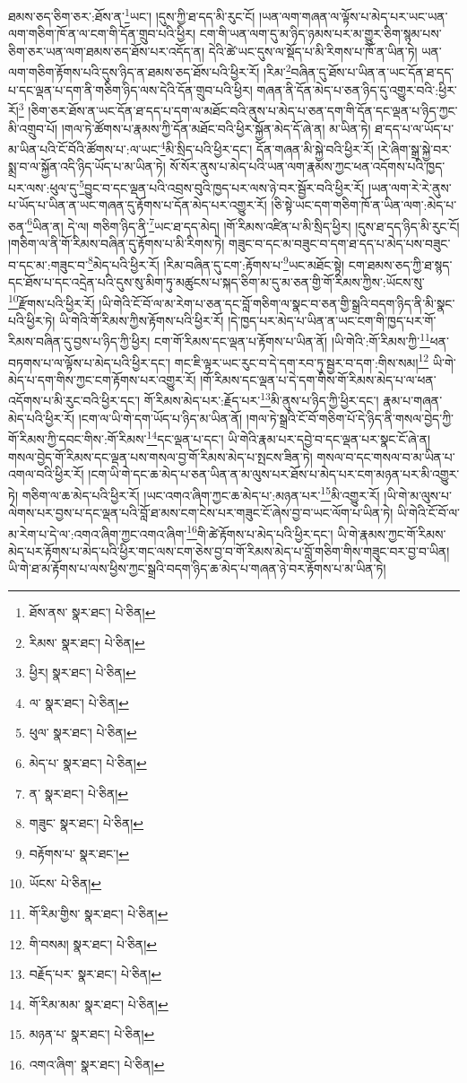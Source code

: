 ཐམས་ཅད་ཅིག་ཅར་:ཐོས་ན་\footnote{ཐོས་ནས་  སྣར་ཐང་།  པེ་ཅིན། }ཡང་། །དུས་ཀྱི་ཐ་དད་མི་རུང་ངོ། །ཡན་ལག་གཞན་ལ་ལྟོས་པ་མེད་པར་ཡང་ཡན་ལག་གཅིག་ཁོ་ན་ལ་ངག་གི་དོན་གྲུབ་པའི་ཕྱིར། ངག་གི་ཡན་ལག་དུ་མ་ཉིད་ཉམས་པར་མ་གྱུར་ཅིག་སྙམ་པས་ཅིག་ཅར་ཡན་ལག་ཐམས་ཅད་ཐོས་པར་འདོད་ན། དེའི་ཚེ་ཡང་དུས་ལ་སྡོད་པ་མི་རིགས་པ་ཁོ་ན་ཡིན་ཏེ། ཡན་ལག་གཅིག་རྟོགས་པའི་དུས་ཉིད་ན་ཐམས་ཅད་ཐོས་པའི་ཕྱིར་རོ། །རིམ་\footnote{རིམས་  སྣར་ཐང་།  པེ་ཅིན། }བཞིན་དུ་ཐོས་པ་ཡིན་ན་ཡང་དོན་ཐ་དད་པ་དང་ལྡན་པ་དག་ནི་གཅིག་ཉིད་ལས་དེའི་དོན་གྲུབ་པའི་ཕྱིར། གཞན་ནི་དོན་མེད་པ་ཅན་ཉིད་དུ་འགྱུར་བའི་:ཕྱིར་རོ།\footnote{ཕྱིར།  སྣར་ཐང་།  པེ་ཅིན། } །ཅིག་ཅར་ཐོས་ན་ཡང་དོན་ཐ་དད་པ་དག་ལ་མཐོང་བའི་ནུས་པ་མེད་པ་ཅན་དག་གི་དོན་དང་ལྡན་པ་ཉིད་ཀྱང་མི་འགྲུབ་པོ། །གལ་ཏེ་ཚོགས་པ་རྣམས་ཀྱི་དོན་མཐོང་བའི་ཕྱིར་སྐྱོན་མེད་དོ་ཞེ་ན། མ་ཡིན་ཏེ། ཐ་དད་པ་ལ་ཡོད་པ་མ་ཡིན་པའི་ངོ་བོའི་ཚོགས་པ་:ལ་ཡང་\footnote{ལ་  སྣར་ཐང་།  པེ་ཅིན། }མི་སྲིད་པའི་ཕྱིར་དང་། དོན་གཞན་མི་སྐྱེ་བའི་ཕྱིར་རོ། །རེ་ཞིག་སྒྲ་སྐྱེ་བར་སྨྲ་བ་ལ་སྐྱོན་འདི་ཉིད་ཡོད་པ་མ་ཡིན་ཏེ། སོ་སོར་ནུས་པ་མེད་པའི་ཡན་ལག་རྣམས་ཀྱང་ཕན་འདོགས་པའི་ཁྱད་པར་ལས་:ཕུལ་དུ་\footnote{ཕུལ་  སྣར་ཐང་།  པེ་ཅིན། }བྱུང་བ་དང་ལྡན་པའི་འབྲས་བུའི་ཁྱད་པར་ལས་ཉེ་བར་སྦྱོར་བའི་ཕྱིར་རོ། །ཡན་ལག་རེ་རེ་ནུས་པ་ཡོད་པ་ཡིན་ན་ཡང་གཞན་དུ་རྟོགས་པ་དོན་མེད་པར་འགྱུར་རོ། །ཅི་སྟེ་ཡང་དག་གཅིག་ཁོ་ན་ཡིན་ལག་:མེད་པ་ཅན་\footnote{མེད་པ་  སྣར་ཐང་།  པེ་ཅིན། }ཡིན་ན། དེ་ལ། གཅིག་ཉིད་ནི་\footnote{ན་  སྣར་ཐང་།  པེ་ཅིན། }ཡང་ཐ་དད་མེད། །གོ་རིམས་འཛིན་པ་མི་སྲིད་ཕྱིར། །དུས་ཐ་དད་ཉིད་མི་རུང་ངོ། །གཅིག་ལ་ནི་གོ་རིམས་བཞིན་དུ་རྟོགས་པ་མི་རིགས་ཏེ། གཟུང་བ་དང་མ་བཟུང་བ་དག་ཐ་དད་པ་མེད་པས་བཟུང་བ་དང་མ་:གཟུང་བ་\footnote{གཟུང་  སྣར་ཐང་།  པེ་ཅིན། }མེད་པའི་ཕྱིར་རོ། །རིམ་བཞིན་དུ་ངག་:རྟོགས་པ་\footnote{བརྟོགས་པ་  སྣར་ཐང་། }ཡང་མཐོང་སྟེ། ངག་ཐམས་ཅད་ཀྱི་ཐ་སྙད་དང་ཐོས་པ་དང་འདྲེན་པའི་དུས་སུ་མིག་ཏུ་མཚུངས་པ་སྐད་ཅིག་མ་དུ་མ་ཅན་གྱི་གོ་རིམས་ཀྱིས་:ཡོངས་སུ་\footnote{ཡོངས་  པེ་ཅིན། }རྫོགས་པའི་ཕྱིར་རོ། །ཡི་གེའི་ངོ་བོ་ལ་མ་རེག་པ་ཅན་དང་བློ་གཅིག་ལ་སྣང་བ་ཅན་གྱི་སྒྲའི་བདག་ཉིད་ནི་མི་སྣང་པའི་ཕྱིར་ཏེ། ཡི་གེའི་གོ་རིམས་ཀྱིས་རྟོགས་པའི་ཕྱིར་རོ། །དེ་ཁྱད་པར་མེད་པ་ཡིན་ན་ཡང་ངག་གི་ཁྱད་པར་གོ་རིམས་བཞིན་དུ་བྱས་པ་ཉིད་ཀྱི་ཕྱིར། ངག་གོ་རིམས་དང་ལྡན་པ་རྟོགས་པ་ཡིན་ནོ། །ཡི་གེའི་:གོ་རིམས་ཀྱི་\footnote{གོ་རིམ་གྱིས་  སྣར་ཐང་།  པེ་ཅིན། }ཕན་བཏགས་པ་ལ་ལྟོས་པ་མེད་པའི་ཕྱིར་དང་། གང་ཇི་ལྟར་ཡང་རུང་བ་དེ་དག་རབ་ཏུ་སྦྱར་བ་དག་:གིས་སམ།\footnote{གི་བསམ།  སྣར་ཐང་།  པེ་ཅིན། } ཡི་གེ་མེད་པ་དག་གིས་ཀྱང་ངག་རྟོགས་པར་འགྱུར་རོ། །གོ་རིམས་དང་ལྡན་པ་དེ་དག་གིས་གོ་རིམས་མེད་པ་ལ་ཕན་འདོགས་པ་མི་རུང་བའི་ཕྱིར་དང་། གོ་རིམས་མེད་པར་:རྗོད་པར་\footnote{བརྗོད་པར་  སྣར་ཐང་།  པེ་ཅིན། }མི་ནུས་པ་ཉིད་ཀྱི་ཕྱིར་དང་། རྣམ་པ་གཞན་མེད་པའི་ཕྱིར་རོ། །ངག་ལ་ཡི་གེ་དག་ཡོད་པ་ཉིད་མ་ཡིན་ནོ། །གལ་ཏེ་སྒྲའི་ངོ་བོ་གཅིག་པོ་དེ་ཉིད་ནི་གསལ་བྱེད་ཀྱི་གོ་རིམས་ཀྱི་དབང་གིས་:གོ་རིམས་\footnote{གོ་རིམ་མམ་  སྣར་ཐང་།  པེ་ཅིན། }དང་ལྡན་པ་དང་། ཡི་གེའི་རྣམ་པར་དབྱེ་བ་དང་ལྡན་པར་སྣང་ངོ་ཞེ་ན། གསལ་བྱེད་གོ་རིམས་དང་ལྡན་པས་གསལ་བྱ་གོ་རིམས་མེད་པ་སྤངས་ཟིན་ཏེ། གསལ་བ་དང་གསལ་བ་མ་ཡིན་པ་འགལ་བའི་ཕྱིར་རོ། །ངག་ཡི་གེ་དང་ཆ་མེད་པ་ཅན་ཡིན་ན་མ་ལུས་པར་ཐོས་པ་མེད་པར་ངག་མཉན་པར་མི་འགྱུར་ཏེ། གཅིག་ལ་ཆ་མེད་པའི་ཕྱིར་རོ། །ཡང་འགའ་ཞིག་ཀྱང་ཆ་མེད་པ་:མཉན་པར་\footnote{མཉན་པ་  སྣར་ཐང་།  པེ་ཅིན། }མི་འགྱུར་རོ། །ཡི་གེ་མ་ལུས་པ་ལེགས་པར་བྱས་པ་དང་ལྡན་པའི་བློ་ཐ་མས་ངག་ངེས་པར་གཟུང་ངོ་ཞེས་བྱ་བ་ཡང་ལོག་པ་ཡིན་ཏེ། ཡི་གེའི་ངོ་བོ་ལ་མ་རེག་པ་དེ་ལ་:འགའ་ཞིག་ཀྱང་འགའ་ཞིག་\footnote{འགའ་ཞིག་  སྣར་ཐང་།  པེ་ཅིན། }གི་ཚེ་རྟོགས་པ་མེད་པའི་ཕྱིར་དང་། ཡི་གེ་རྣམས་ཀྱང་གོ་རིམས་མེད་པར་རྟོགས་པ་མེད་པའི་ཕྱིར་གང་ལས་ངག་ཅེས་བྱ་བ་གོ་རིམས་མེད་པ་བློ་གཅིག་གིས་གཟུང་བར་བྱ་བ་ཡིན། ཡི་གེ་ཐ་མ་རྟོགས་པ་ལས་ཕྱིས་ཀྱང་སྒྲའི་བདག་ཉིད་ཆ་མེད་པ་གཞན་ཉེ་བར་རྟོགས་པ་མ་ཡིན་ཏེ། 